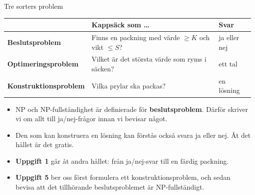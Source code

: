 \documentclass[aspectratio=169,10pt]{beamer}
\begin{document}
\begin{frame}{Tre sorters problem}
  \centering
  \begin{tabular}{@{}L{3.9cm}L{7.0cm}L{1.9cm}@{}}
    \toprule
     & \textbf{Kappsäck som \dots} & \textbf{Svar} \\
    \midrule
    \textbf{Beslutsproblem} & Finns en packning med värde $\ge K$ och vikt $\le S$? & ja eller nej \\
    \textbf{Optimeringsproblem} & Vilket är det största värde som ryms i säcken? & ett tal \\
    \textbf{Konstruktionsproblem} & Vilka prylar ska packas? & en lösning \\
    \bottomrule
  \end{tabular}
  \vspace{3mm}
  \begin{itemize}
    \item<2-> NP och NP-fullständighet är definierade för \textbf{beslutsproblem}. Därför skriver vi om allt till ja/nej-frågor innan vi bevisar något.
    \item<3-> Den som kan konstruera en lösning kan förstås också svara ja eller nej. Åt det hållet är det gratis.
    \item<4-> \textbf{Uppgift 1} går åt andra hållet: från ja/nej-svar till en färdig packning.
    \item<5-> \textbf{Uppgift 5} ber oss först formulera ett konstruktionsproblem, och sedan bevisa att det tillhörande beslutsproblemet är NP-fullständigt.
  \end{itemize}
\end{frame}
\end{document}
